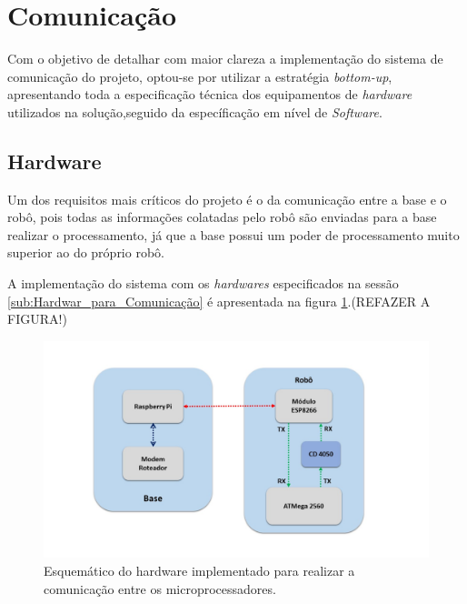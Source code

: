 \section{Comunicação} %
\label{sec:comunicação2}

	Com o objetivo de detalhar com maior clareza a implementação do sistema de comunicação do projeto, optou-se por utilizar a estratégia \textit{bottom-up}, apresentando toda a especificação técnica dos equipamentos de \textit{hardware} utilizados na solução,seguido da específicação em nível de \textit{Software}.

	\subsection{Hardware} %
	\label{sub:hardware}
		Um dos requisitos mais críticos do projeto é o da comunicação entre a base e o robô, pois todas as informações colatadas pelo robô são enviadas para a base realizar o processamento, já que a base possui um poder de processamento muito superior ao do próprio robô.

		A implementação do sistema com os \textit{hardwares} especificados na sessão \ref{sub:Hardwar_para_Comunicação} é apresentada na figura \ref{img:hardware_comunicação}.(REFAZER A FIGURA!)

		\begin{figure}[H]                                                           
      		\centering                    
      		\includegraphics[scale=0.5]{figuras/Hardware_Comunicacao.jpg}               
      		\caption{Esquemático do hardware implementado para realizar a comunicação entre os microprocessadores.}    
      		\label{img:hardware_comunicação}                                            
    	\end{figure}

